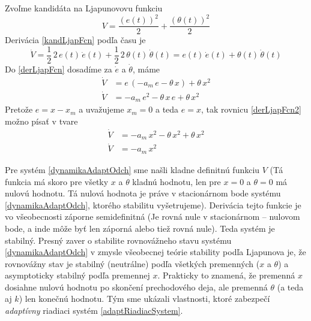 \documentclass[a4paper, 10pt, ]{article}
\begin{document}
Zvoľme kandidáta na Ljapunovovu funkciu
\begin{equation} \label{kandLjapFcn}
	V = \frac{\left(e(t)\right)^2}{2} + \frac{\left(\theta(t)\right)^2}{2}
\end{equation}
Derivácia \eqref{kandLjapFcn} podľa času je
\begin{equation} \label{derLjapFcn}
	\dot{V} = \frac{1}{2} \, 2 \, e(t) \, \dot{e}(t) + \frac{1}{2} \, 2 \, \theta(t) \, \dot{\theta}(t) =  e(t) \, \dot{e}(t) +  \theta(t) \, \dot{\theta}(t)
\end{equation}
Do \eqref{derLjapFcn} dosadíme za $\dot{e}$ a $\dot{\theta}$, máme
\begin{subequations}
	\begin{align}
	\dot{V} &=   e \, \left( -a_m\,e - \theta \, x \right) +  \theta \, x^2 \\
	\dot{V} &=    -a_m\,e^2 - \theta\, x \, e  +  \theta \, x^2 \label{derLjapFcn2}
	\end{align}
\end{subequations}
Pretože $e = x - x_m$ a uvažujeme $x_m = 0$ a teda $e = x$, tak rovnicu \eqref{derLjapFcn2} možno písať v tvare
\begin{subequations}
	\begin{align}
		\dot{V} &=    -a_m\,x^2 - \theta\, x^2  +  \theta \, x^2 \\
		\dot{V} &=    -a_m\,x^2
	\end{align}
\end{subequations}

Pre systém \eqref{dynamikaAdaptOdch} sme našli kladne definitnú funkciu $V$ (Tá funkcia má skoro pre všetky $x$ a $\theta$ kladnú hodnotu, len pre $x=0$ a $\theta = 0$ má nulovú hodnotu. Tá nulová hodnota je práve v stacionárnom bode systému \eqref{dynamikaAdaptOdch}, ktorého stabilitu vyšetrujeme). Derivácia tejto funkcie je vo všeobecnosti záporne semidefinitná (Je rovná nule v stacionárnom -- nulovom bode, a inde môže byť len záporná alebo tiež rovná nule). Teda systém je stabilný. Presný zaver o stabilite rovnovážneho stavu systému \eqref{dynamikaAdaptOdch} v zmysle všeobecnej teórie stability podľa Ljapunova je, že rovnovážny stav je stabilný (neutrálne) podľa všetkých premenných ($x$ a $\theta$) a asymptoticky stabilný podľa premennej $x$. Prakticky to znamená, že premenná $x$ dosiahne nulovú hodnotu po skončení prechodového deja, ale premenná $\theta$ (a teda aj $k$) len konečnú hodnotu. Tým sme ukázali vlastnosti, ktoré zabezpečí \emph{adaptívny} riadiaci systém \eqref{adaptRiadiacSystem}.
\end{document}
